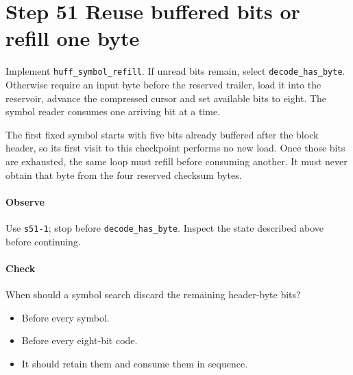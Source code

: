 \section{Step 51 Reuse buffered bits or refill one byte}\label{png-huff-s51}
Implement \texttt{huff\_symbol\_refill}. If unread bits remain, select \texttt{decode\_has\_byte}. Otherwise require an input byte before the reserved trailer, load it into the reservoir, advance the compressed cursor and set available bits to eight. The symbol reader consumes one arriving bit at a time.

The first fixed symbol starts with five bits already buffered after the block header, so its first visit to this checkpoint performs no new load. Once those bits are exhausted, the same loop must refill before consuming another. It must never obtain that byte from the four reserved checksum bytes.

\paragraph{Observe} Use \texttt{s51-1}; stop before \texttt{decode\_has\_byte}. Inspect the state described above before continuing.

\paragraph{Check} When should a symbol search discard the remaining header-byte bits?
\begin{itemize}
\item[A.] Before every symbol.
\item[B.] Before every eight-bit code.
\item[C.] It should retain them and consume them in sequence.
\end{itemize}
